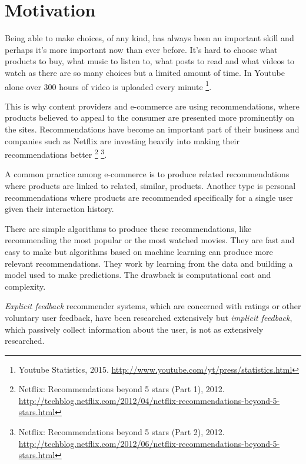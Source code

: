 
\section{Motivation}\label{sec:intro:motivation}

Being able to make choices, of any kind, has always been an important skill and perhaps it's more important now than ever before. It's hard to choose what products to buy, what music to listen to, what posts to read and what videos to watch as there are so many choices but a limited amount of time. In Youtube alone over 300 hours of video is uploaded every minute
\footnote{Youtube Statistics, 2015. \url{http://www.youtube.com/yt/press/statistics.html}}.

This is why content providers and e-commerce are using recommendations, where products believed to appeal to the consumer are presented more prominently on the sites. Recommendations have become an important part of their business and companies such as Netflix are investing heavily into making their recommendations better
\footnote{ Netflix: Recommendations beyond 5 stars (Part 1), 2012. \url{http://techblog.netflix.com/2012/04/netflix-recommendations-beyond-5-stars.html} }
\footnote{ Netflix: Recommendations beyond 5 stars (Part 2), 2012. \url{http://techblog.netflix.com/2012/06/netflix-recommendations-beyond-5-stars.html} }.

A common practice among e-commerce is to produce related recommendations where products are linked to related, similar, products. Another type is personal recommendations where products are recommended specifically for a single user given their interaction history.

There are simple algorithms to produce these recommendations, like recommending the most popular or the most watched movies. They are fast and easy to make but algorithms based on machine learning can produce more relevant recommendations. They work by learning from the data and building a model used to make predictions. The drawback is computational cost and complexity.

\textit{Explicit feedback} recommender systems, which are concerned with ratings or other voluntary user feedback, have been researched extensively but \textit{implicit feedback}, which passively collect information about the user, is not as extensively researched. \citep{hu2008collaborative, bobadilla2013recommender}

